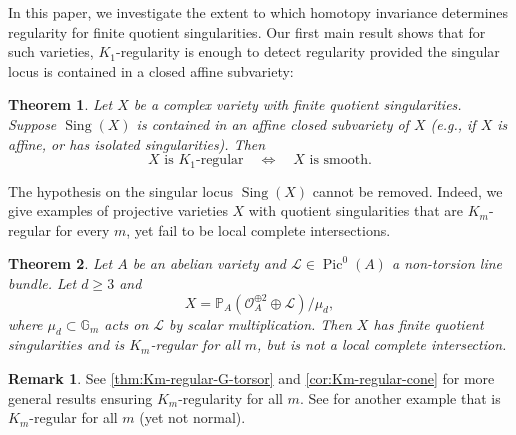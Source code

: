 \documentclass{amsart}
\newtheorem{theorem}{Theorem}[section]
\newtheorem{question}[question]{Question}
\theoremstyle{definition}
\newtheorem{remark}[remark]{Remark}
\newcommand{\bG}{\mathbb{G}}
\newcommand{\bP}{\mathbb{P}}
\newcommand{\cO}{\mathcal{O}}
\newcommand{\cL}{\mathcal{L}}
\DeclareMathOperator{\Sing}{Sing}
\DeclareMathOperator{\Pic}{Pic}
\begin{document}
In this paper, we investigate the extent to which homotopy invariance determines regularity for finite quotient singularities. Our first main result shows that for such varieties, $K_1$-regularity is enough to detect regularity provided the singular locus is contained in a closed affine subvariety:




\begin{theorem}\label{thm:finite-quotient-k1-regular-smooth}
Let $X$ be a complex variety with finite quotient singularities. Suppose $\Sing(X)$ is contained in an affine closed subvariety of $X$ (e.g., if $X$ is affine, or has isolated singularities). Then
\[
    X \text{ is $K_1$-regular}
    \quad\Longleftrightarrow\quad
    X \text{ is smooth}.
\]
\end{theorem}


The hypothesis on the singular locus $\Sing(X)$ cannot be removed. Indeed, we give examples of projective varieties $X$ with quotient singularities that are $K_m$-regular for every $m$, yet fail to be local complete intersections.

\begin{theorem}\label{thm:projective-finite-quotient-Km-regular}
    Let $A$ be an abelian variety and $\cL\in\Pic^0(A)$ a non-torsion line bundle. Let $d\geq3$ and
    \[
        X=\bP_A(\cO_A^{\oplus2}\oplus\cL)/\mu_d,
    \]
    where $\mu_d\subset\bG_m$ acts on $\cL$ by scalar multiplication. Then $X$ has finite quotient singularities and is $K_m$-regular for all $m$, but is not a local complete intersection.
\end{theorem}

\begin{remark}
    See \autoref{thm:Km-regular-G-torsor} and \autoref{cor:Km-regular-cone} for more general results ensuring $K_m$-regularity for all $m$. See \cite[Theorem 4.3]{HaesemeyerWeibelLineBundles} for another example that is $K_m$-regular for all $m$ (yet not normal).
\end{remark}
\end{document}
